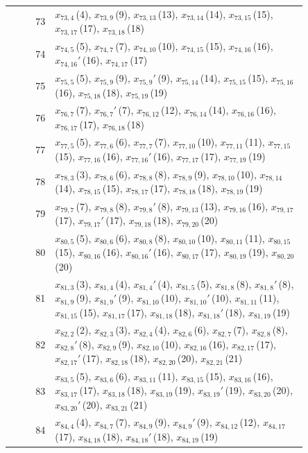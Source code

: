 \documentclass[11pt]{article}
\begin{document}
\begin{center}
\begin{longtable}{r>{\raggedright\arraybackslash}p{0.85\linewidth}}
73 & $x_{73,4}$\,(4), $x_{73,9}$\,(9), $x_{73,13}$\,(13), $x_{73,14}$\,(14), $x_{73,15}$\,(15), $x_{73,17}$\,(17), $x_{73,18}$\,(18) \\
74 & $x_{74,5}$\,(5), $x_{74,7}$\,(7), $x_{74,10}$\,(10), $x_{74,15}$\,(15), $x_{74,16}$\,(16), $x_{74,16}'$\,(16), $x_{74,17}$\,(17) \\
75 & $x_{75,5}$\,(5), $x_{75,9}$\,(9), $x_{75,9}'$\,(9), $x_{75,14}$\,(14), $x_{75,15}$\,(15), $x_{75,16}$\,(16), $x_{75,18}$\,(18), $x_{75,19}$\,(19) \\
76 & $x_{76,7}$\,(7), $x_{76,7}'$\,(7), $x_{76,12}$\,(12), $x_{76,14}$\,(14), $x_{76,16}$\,(16), $x_{76,17}$\,(17), $x_{76,18}$\,(18) \\
77 & $x_{77,5}$\,(5), $x_{77,6}$\,(6), $x_{77,7}$\,(7), $x_{77,10}$\,(10), $x_{77,11}$\,(11), $x_{77,15}$\,(15), $x_{77,16}$\,(16), $x_{77,16}'$\,(16), $x_{77,17}$\,(17), $x_{77,19}$\,(19) \\
78 & $x_{78,3}$\,(3), $x_{78,6}$\,(6), $x_{78,8}$\,(8), $x_{78,9}$\,(9), $x_{78,10}$\,(10), $x_{78,14}$\,(14), $x_{78,15}$\,(15), $x_{78,17}$\,(17), $x_{78,18}$\,(18), $x_{78,19}$\,(19) \\
79 & $x_{79,7}$\,(7), $x_{79,8}$\,(8), $x_{79,8}'$\,(8), $x_{79,13}$\,(13), $x_{79,16}$\,(16), $x_{79,17}$\,(17), $x_{79,17}'$\,(17), $x_{79,18}$\,(18), $x_{79,20}$\,(20) \\
80 & $x_{80,5}$\,(5), $x_{80,6}$\,(6), $x_{80,8}$\,(8), $x_{80,10}$\,(10), $x_{80,11}$\,(11), $x_{80,15}$\,(15), $x_{80,16}$\,(16), $x_{80,16}'$\,(16), $x_{80,17}$\,(17), $x_{80,19}$\,(19), $x_{80,20}$\,(20) \\
81 & $x_{81,3}$\,(3), $x_{81,4}$\,(4), $x_{81,4}'$\,(4), $x_{81,5}$\,(5), $x_{81,8}$\,(8), $x_{81,8}'$\,(8), $x_{81,9}$\,(9), $x_{81,9}'$\,(9), $x_{81,10}$\,(10), $x_{81,10}'$\,(10), $x_{81,11}$\,(11), $x_{81,15}$\,(15), $x_{81,17}$\,(17), $x_{81,18}$\,(18), $x_{81,18}'$\,(18), $x_{81,19}$\,(19) \\
82 & $x_{82,2}$\,(2), $x_{82,3}$\,(3), $x_{82,4}$\,(4), $x_{82,6}$\,(6), $x_{82,7}$\,(7), $x_{82,8}$\,(8), $x_{82,8}'$\,(8), $x_{82,9}$\,(9), $x_{82,10}$\,(10), $x_{82,16}$\,(16), $x_{82,17}$\,(17), $x_{82,17}'$\,(17), $x_{82,18}$\,(18), $x_{82,20}$\,(20), $x_{82,21}$\,(21) \\
83 & $x_{83,5}$\,(5), $x_{83,6}$\,(6), $x_{83,11}$\,(11), $x_{83,15}$\,(15), $x_{83,16}$\,(16), $x_{83,17}$\,(17), $x_{83,18}$\,(18), $x_{83,19}$\,(19), $x_{83,19}'$\,(19), $x_{83,20}$\,(20), $x_{83,20}'$\,(20), $x_{83,21}$\,(21) \\
84 & $x_{84,4}$\,(4), $x_{84,7}$\,(7), $x_{84,9}$\,(9), $x_{84,9}'$\,(9), $x_{84,12}$\,(12), $x_{84,17}$\,(17), $x_{84,18}$\,(18), $x_{84,18}'$\,(18), $x_{84,19}$\,(19) \\

\end{longtable}
\end{center}
\end{document}
